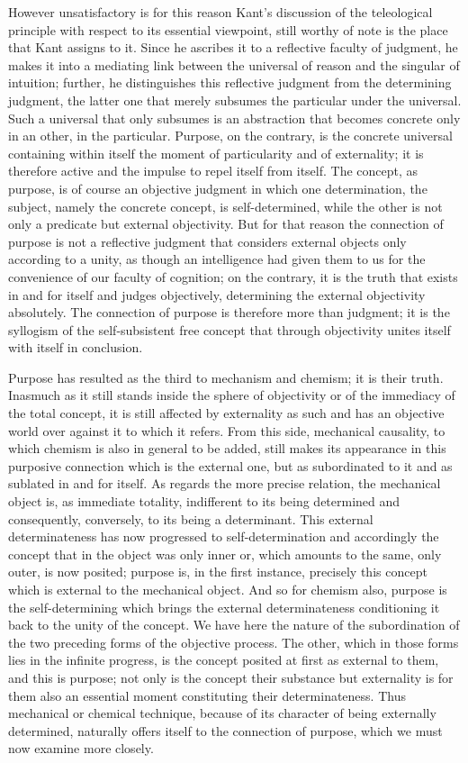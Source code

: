 However unsatisfactory is for this reason Kant's discussion
of the teleological principle with respect to its essential viewpoint,
still worthy of note is the place that Kant assigns to it.
Since he ascribes it to a reflective faculty of judgment,
he makes it into a mediating link between
the universal of reason and the singular of intuition;
further, he distinguishes this reflective judgment
from the determining judgment, the latter one
that merely subsumes the particular under the universal.
Such a universal that only subsumes is an abstraction
that becomes concrete only in an other, in the particular.
Purpose, on the contrary, is the concrete universal
containing within itself the moment
of particularity and of externality;
it is therefore active and the impulse
to repel itself from itself.
The concept, as purpose, is of course an objective judgment
in which one determination, the subject,
namely the concrete concept, is self-determined,
while the other is not only a predicate but external objectivity.
But for that reason the connection of purpose is not
a reflective judgment that considers external objects
only according to a unity,
as though an intelligence had given them to us
for the convenience of our faculty of cognition;
on the contrary, it is the truth that exists in
and for itself and judges objectively,
determining the external objectivity absolutely.
The connection of purpose is therefore more than judgment;
it is the syllogism of the self-subsistent free concept
that through objectivity unites itself with itself in conclusion.

Purpose has resulted as the third
to mechanism and chemism;
it is their truth.
Inasmuch as it still stands
inside the sphere of objectivity
or of the immediacy of the total concept,
it is still affected by externality as such
and has an objective world over
against it to which it refers.
From this side, mechanical causality,
to which chemism is also in general to be added,
still makes its appearance in this purposive connection
which is the external one,
but as subordinated to it
and as sublated in and for itself.
As regards the more precise relation,
the mechanical object is, as immediate totality,
indifferent to its being determined and consequently,
conversely, to its being a determinant.
This external determinateness has now
progressed to self-determination
and accordingly the concept that
in the object was only inner
or, which amounts to the same,
only outer, is now posited;
purpose is, in the first instance,
precisely this concept which is
external to the mechanical object.
And so for chemism also, purpose is the self-determining
which brings the external determinateness conditioning it
back to the unity of the concept.
We have here the nature of the subordination of
the two preceding forms of the objective process.
The other, which in those forms lies in the infinite progress,
is the concept posited at first as external to them,
and this is purpose;
not only is the concept their substance
but externality is for them also
an essential moment constituting their determinateness.
Thus mechanical or chemical technique,
because of its character of being externally determined,
naturally offers itself to the connection of purpose,
which we must now examine more closely.

